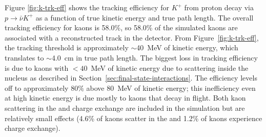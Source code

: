 Figure \ref{fig:k-trk-eff} shows the tracking efficiency for $K^{+}$  from proton decay via $p\rightarrow \bar{\nu}K^{+}$ as a function of true kinetic energy and true path length. The overall tracking efficiency for kaons is 58.0$\%$, so 58.0\% of the simulated kaons are associated with a reconstructed track in the detector.  From Figure~\ref{fig:k-trk-eff}, the tracking threshold is approximately $\sim$40~MeV of kinetic energy, which translates to $\sim$4.0~cm in true path length.  The biggest loss in tracking efficiency is due to kaons with $<40$~MeV of kinetic energy due to scattering inside the nucleus as described in Section~\ref{sec:final-state-interactions}.  The efficiency levels off to approximately $80\%$ above 80~MeV of kinetic energy; this inefficiency even at high kinetic energy is due mostly to kaons that decay in flight.
Both kaon scattering in the  and charge exchange are included in the simulation but are relatively small effects (4.6\% of kaons scatter in the  and 1.2$\%$ of kaons experience charge exchange).   





